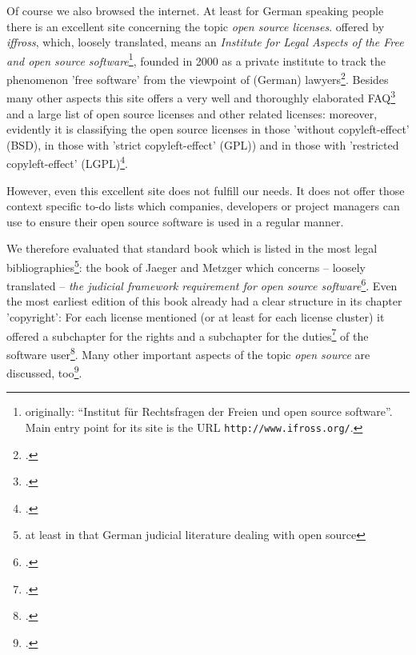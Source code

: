 Of course we also browsed the internet. At least for German speaking people
there is an excellent site concerning the topic \emph{open source licenses}.
offered by \textit{iffross}, which, loosely translated, means an
\textit{Institute for Legal Aspects of the Free and open source
software}\footnote{originally: \enquote{Institut für Rechtsfragen der Freien und
open source software}. Main entry point for its site is the URL
\texttt{http://www.ifross.org/}.}, founded in 2000 as a private institute to
track the phenomenon 'free software' from the viewpoint of (German)
lawyers\footcite[cf.][\nopage wp]{ifross2011b}. Besides many other
aspects this site offers a very well and thoroughly elaborated
FAQ\footcite[cf.][\nopage wp]{ifross2011c} and a large list of open
source licenses and other related licenses: moreover, evidently it is
classifying the open source licenses in those 'without copyleft-effect' (BSD),
in those with 'strict copyleft-effect' (GPL)) and in those with 'restricted
copyleft-effect' (LGPL)\footcite[cf.][\nopage wp]{ifross2011a}.

However, even this excellent site does not fulfill our needs. It does not offer
those context specific to-do lists which companies, developers or project
managers can use to ensure their open source software is used in a regular
manner.

We therefore evaluated that standard book which is listed in the most legal
bibliographies\footnote{at least in that German judicial literature dealing with
open source}: the book of Jaeger and Metzger which concerns -- loosely translated
-- \textit{the judicial framework requirement for open source
software}\footcite[cf.][V -- It can not be any surprise that both authors,
Mr. Jaeger and Mr. Metzger are members of ifross (cf.
\texttt{http://www.ifross.org/personen/}, wp.)]{JaeMet2002a}. Even the most
earliest edition of this book already had a clear structure in its chapter
'copyright': For each license mentioned (or at least for each license cluster)
it offered a subchapter for the rights and a subchapter for the
duties\footcite[cf.][30ff]{JaeMet2002a} of the software user\footcite[For
getting a good survey of the structure and the line of thought see the contents
cf.][VIIIf]{JaeMet2002a}. Many other important aspects of the topic
\textit{open source} are discussed, too\footcite[pars pro toto: have a
look at the chapter concerning the liability: cf.][137ff]{JaeMet2002a}.

